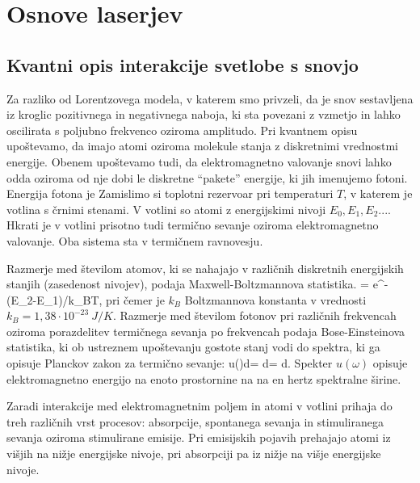 
\chapter{Osnove laserjev}

\section{Kvantni opis interakcije svetlobe s snovjo}
Za razliko od Lorentzovega modela, v katerem smo privzeli, da je snov sestavljena
iz kroglic pozitivnega in negativnega naboja, ki sta povezani z vzmetjo
in lahko oscilirata s poljubno frekvenco oziroma amplitudo. Pri kvantnem
opisu upoštevamo, da imajo atomi oziroma molekule stanja z diskretnimi vrednostmi
energije. Obenem upoštevamo tudi, da elektromagnetno valovanje snovi
lahko odda oziroma od nje dobi le diskretne ``pakete'' energije, ki jih imenujemo
fotoni. Energija fotona je 
Zamislimo si toplotni rezervoar pri temperaturi $T$, v katerem je votlina s črnimi
stenami. V votlini so atomi z energijskimi nivoji $E_0, E_1, E_2...$. Hkrati je 
v votlini prisotno tudi termično sevanje oziroma elektromagnetno valovanje. Oba sistema
sta v termičnem ravnovesju.

Razmerje med številom atomov, ki se nahajajo v različnih  diskretnih energijskih
stanjih (zasedenost nivojev), podaja Maxwell-Boltzmannova statistika. 
\beq
{} = e^{-(E_2-E_1)/k_BT},
\eeq
pri čemer je $k_B$ Boltzmannova konstanta v vrednosti $k_B = 1,38 \cdot 10^{-23}~\si{J/K}$.
Razmerje med številom fotonov pri različnih frekvencah oziroma porazdelitev 
termičnega sevanja po frekvencah podaja Bose-Einsteinova statistika, ki ob 
ustreznem upoštevanju gostote stanj vodi do spektra, ki ga opisuje Planckov zakon
za termično sevanje:
\beq
u(\omega)d\omega = \hbar \omega {} d\omega = 
d\omega.
\eeq
Spekter $u(\omega)$ opisuje elektromagnetno energijo na enoto prostornine na na 
en hertz spektralne širine. 

Zaradi interakcije med elektromagnetnim poljem in atomi v votlini prihaja do treh različnih
vrst procesov: absorpcije, spontanega sevanja in stimuliranega sevanja oziroma stimulirane
emisije. Pri emisijskih pojavih prehajajo atomi iz višjih na nižje energijske nivoje, pri 
absorpciji pa iz nižje na višje energijske nivoje. 


